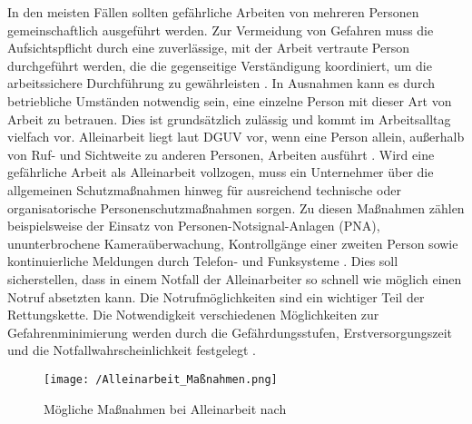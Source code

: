 \documentclass[thesis.tex]{subfiles}
\begin{document}
In den meisten Fällen sollten gefährliche Arbeiten von mehreren Personen gemeinschaftlich ausgeführt werden.
Zur Vermeidung von Gefahren muss die Aufsichtspflicht durch eine zuverlässige, mit der Arbeit vertraute Person durchgeführt werden, die die gegenseitige Verständigung koordiniert, um die arbeitssichere Durchführung zu gewährleisten \cite[vgl.~§~8.1][]{Vorschrift1_DGUV}.
In Ausnahmen kann es durch betriebliche Umständen notwendig sein, eine einzelne Person mit dieser Art von Arbeit zu betrauen. Dies ist grundsätzlich zulässig und kommt im Arbeitsalltag vielfach vor.
Alleinarbeit liegt laut DGUV vor, wenn eine Person allein, außerhalb von Ruf- und Sichtweite zu anderen Personen, Arbeiten ausführt \cite[S.~41~2.7.2][]{Regel_100-001}.
Wird eine gefährliche Arbeit als Alleinarbeit vollzogen, muss ein Unternehmer über die allgemeinen Schutzmaßnahmen hinweg für ausreichend technische oder organisatorische Personenschutzmaßnahmen sorgen.
Zu diesen Maßnahmen zählen beispielsweise der Einsatz von Personen-Notsignal-Anlagen (PNA), ununterbrochene Kameraüberwachung, Kontrollgänge einer zweiten Person sowie kontinuierliche Meldungen durch Telefon- und Funksysteme \cite[vgl.~S.~43~2.7.2][]{Regel_100-001}.
Dies soll sicherstellen, dass in einem Notfall der Alleinarbeiter so schnell wie möglich einen Notruf absetzten kann.
Die Notrufmöglichkeiten sind ein wichtiger Teil der Rettungskette.
Die Notwendigkeit verschiedenen Möglichkeiten zur Gefahrenminimierung werden durch die Gefährdungsstufen, Erstversorgungszeit und die Notfallwahrscheinlichkeit festgelegt \cite[vgl.~S.~13-18][]{Regel_112-139}.

\begin{figure}[h]
    \centering
    \texttt{[image: /Alleinarbeit\_Maßnahmen.png]}
    \caption[Mögliche Maßnahmen bei Alleinarbeit]{Mögliche Maßnahmen bei Alleinarbeit nach \cite[]{Information_212-139}}
    \label{fig:alleinarbeit_beurteilung}
\end{figure}
\end{document}
